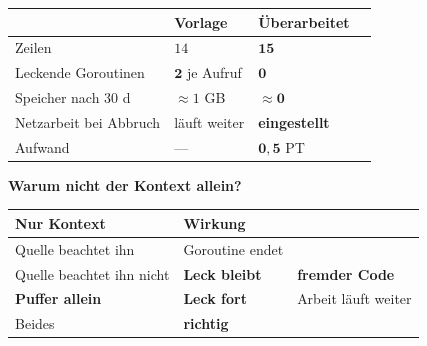 \begin{merksatz}
\begin{center}
{\small
\renewcommand{\arraystretch}{1.45}
\begin{tabular}{@{}P{2.8cm}P{2.0cm}P{2.2cm}P{2.0cm}@{}}
\toprule
& \textbf{Vorlage} & \textbf{Überarbeitet} & \\
\midrule
Zeilen & $14$ & $\mathbf{15}$ & \\
Leckende Goroutinen & $\mathbf{2}$ je Aufruf & $\mathbf{0}$ & \\
Speicher nach $30$ d & \textcolor{akzent}{$\approx1$ GB} & \textcolor{gruen}{$\approx\mathbf{0}$} & \\
Netzarbeit bei Abbruch & \textcolor{akzent}{läuft weiter} & \textcolor{gruen}{\textbf{eingestellt}} & \\
Aufwand & --- & $\mathbf{0{,}5}$ PT & \\
\bottomrule
\end{tabular}}
\end{center}

\begin{center}
\begin{minipage}{0.88\textwidth}
\end{minipage}
\end{center}

\textbf{Warum nicht der Kontext allein?}

\begin{center}
\renewcommand{\arraystretch}{1.45}
\begin{tabular}{@{}P{3.0cm}P{2.2cm}P{2.6cm}@{}}
\toprule
\textbf{Nur Kontext} & \textbf{Wirkung} & \\
\midrule
Quelle beachtet ihn & \textcolor{gruen}{Goroutine endet} & \\
Quelle beachtet ihn nicht & \textcolor{akzent}{\textbf{Leck bleibt}} & \textcolor{akzent}{\textbf{fremder Code}}\\
\textbf{Puffer allein} & \textcolor{gruen}{\textbf{Leck fort}} & \textcolor{akzent}{Arbeit läuft weiter}\\
Beides & \textcolor{gruen}{\textbf{richtig}} & \\
\bottomrule
\end{tabular}
\end{center}

\begin{center}
\end{center}
\end{merksatz}

